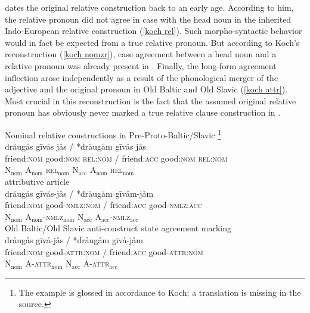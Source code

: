 \citet[468, 470]{koch1999} dates the original relative construction back to an early  age. According to him, the relative pronoun did not agree in case with the head noun in the inherited Indo-European relative construction (\ref{koch rel}). Such morpho-syntactic behavior would in fact be expected from a true relative pronoun. But according to Koch's reconstruction (\ref{koch nomzr}), case agreement between a head noun and a relative pronoun was already present in . Finally, the long-form agreement inflection arose independently as a result of the phonological merger of the adjective and the original pronoun in Old Baltic and Old Slavic (\ref{koch attr}). Most crucial in this reconstruction is the fact that the assumed original relative pronoun has obviously never marked a true relative clause construction in .
\begin{exe}
\ex \label{koch rel}
\begin{xlist}
\ex	\rm{Nominal relative constructions in Pre-Proto\hyp{}Baltic\slash{}Slavic \citep[468]{koch1999}}\footnote{The example is glossed in accordance to Koch; a translation is missing in the source.}\\
\glll	*dråugås gīvås jås / *dråugåm gīvås jås\\
	friend:\textsc{nom} good:\textsc{nom} \textsc{rel:nom} / friend:\textsc{acc} good:\textsc{nom} \textsc{rel:nom}\\
	N$_{\text{nom}}$ A$_{\text{nom}}$ \textsc{rel}$_{\text{nom}}$ { } N$_{\text{acc}}$ A$_{\text{nom}}$ \textsc{rel}$_{\text{nom}}$\\
\ex	\rm{ attributive article}\\ \label{koch nomzr}
\glll	*dråugås gīvås-jås / *dråugåm gīvåm-jåm\\
	friend:\textsc{nom} good-\textsc{nmlz:nom} / friend:\textsc{acc} good-\textsc{nmlz:acc}\\
	N$_{\text{nom}}$ A$_{\text{nom}}$-\textsc{nmlz}$_{\text{nom}}$ { } N$_{\text{acc}}$ A$_{\text{acc}}$-\textsc{nmlz}$_{\text{acc}}$\\
\ex	\rm{Old Baltic/Old Slavic anti\hyp{}construct state agreement marking}\\ \label{koch attr}
\glll	*dråugås gīvå-jås / *dråugåm gīvå-jåm\\
	friend:\textsc{nom} good-\textsc{attr:nom} / friend:\textsc{acc} good-\textsc{attr:nom}\\
	N$_{\text{nom}}$ A-\textsc{attr}$_{\text{nom}}$ { } N$_{\text{acc}}$ A-\textsc{attr}$_{\text{acc}}$\\
\end{xlist}
\end{exe}
